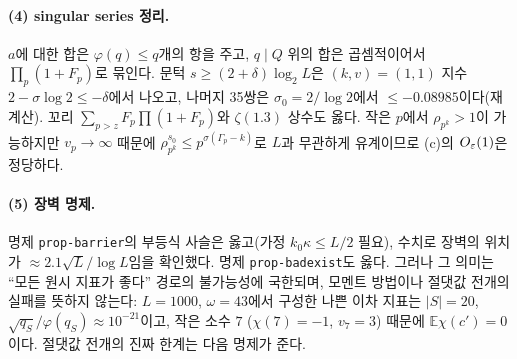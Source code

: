 \paragraph{(4) singular series 정리.}
$a$에 대한 합은 $\varphi(q)\le q$개의 항을 주고, $q\mid Q$ 위의 합은 곱셈적이어서 $\prod_p(1+F_p)$로 묶인다. 문턱 $s\ge(2+\delta)\log_2L$은 $(k,v)=(1,1)$ 지수
$2-\sigma\log2\le-\delta$에서 나오고, 나머지 35쌍은 $\sigma_0=2/\log2$에서 $\le-0.08985$이다(재계산). 꼬리 $\sum_{p>z}F_p\prod(1+F_p)$와 $\zeta(1.3)$ 상수도 옳다.
작은 $p$에서 $\rho_{p^k}>1$이 가능하지만 $v_p\to\infty$ 때문에 $\rho_{p^k}^{s_0}\le p^{\sigma(\Gamma_p-k)}$로 $L$과 무관하게 유계이므로 (c)의 $O_\varepsilon(1)$은 정당하다.

\paragraph{(5) 장벽 명제.}
명제 \texttt{prop-barrier}의 부등식 사슬은 옳고(가정 $k_0\kappa\le L/2$ 필요), 수치로 장벽의 위치가 $\approx2.1\sqrt L/\log L$임을 확인했다.
명제 \texttt{prop-badexist}도 옳다. 그러나 그 의미는 ``모든 원시 지표가 좋다'' 경로의 불가능성에 국한되며, 모멘트 방법이나 절댓값 전개의 실패를 뜻하지 않는다:
$L=1000$, $\omega=43$에서 구성한 나쁜 이차 지표는 $|S|=20$, $\sqrt{q_S}/\varphi(q_S)\approx10^{-21}$이고, 작은 소수 $7$ ($\chi(7)=-1$, $v_7=3$) 때문에 $\mathbb E\chi(c')=0$이다.
절댓값 전개의 진짜 한계는 다음 명제가 준다.

